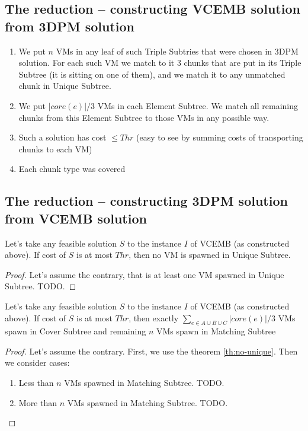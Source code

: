 \subsection{The reduction -- constructing VCEMB solution from 3DPM
  solution}

\begin{enumerate}
  \item We put $n$ VMs in any leaf of such Triple Subtries that were
  chosen in 3DPM solution. For each such VM we match to it 3 chunks
  that are put in its Triple Subtree (it is sitting on one of them),
  and we match it to any unmatched chunk in Unique Subtree.
  \item We put $|core(e)|/3$ VMs in each Element Subtree. We match all remaining
  chunks from this Element Subtree to those VMs in any possible
  way.
  \item Such a solution has cost $\leq Thr$ (easy to see by
  summing costs of transporting chunks to each VM)
  \item Each chunk type was covered
\end{enumerate}

\subsection{The reduction -- constructing 3DPM solution from VCEMB
  solution}

\begin{theorem}
  Let's take any feasible solution $S$ to the instance $I$ of VCEMB
  (as constructed above). If cost of $S$ is at most $Thr$, then no VM
  is spawned in Unique Subtree.
  \label{th:no-unique}
\end{theorem}

\begin{proof}
  Let's assume the contrary, that is at least one VM spawned in Unique
  Subtree. TODO.
\end{proof}

\begin{theorem}
  Let's take any feasible solution $S$ to the instance $I$ of VCEMB
  (as constructed above). If cost of $S$ is at most $Thr$, then
  exactly $\sum_{e\in A\cup B\cup C}|core(e)|/3$ VMs spawn in Cover
  Subtree and remaining $n$ VMs spawn in Matching Subtree
\end{theorem}

\begin{proof}
  Let's assume the contrary. First, we use the theorem
  \ref{th:no-unique}. Then we consider cases:
  \begin{enumerate}
    \item Less than $n$ VMs spawned in Matching Subtree. TODO.
    \item More than $n$ VMs spawned in Matching Subtree. TODO.
  \end{enumerate}
\end{proof}

